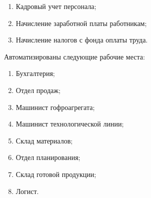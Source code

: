 \begin{enumerate}
\item Кадровый учет персонала;
\item Начисление заработной платы работникам;
\item Начисление налогов с фонда оплаты труда.
\end{enumerate}
%

Автоматизированы следующие рабочие места:
\begin{enumerate}
\item Бухгалтерия;
\item Отдел продаж;
\item Машинист гофроагрегата;
\item Машинист технологической линии; 
\item Склад материалов;
\item Отдел планирования;
\item Склад готовой продукции;
\item Логист.
\end{enumerate}





